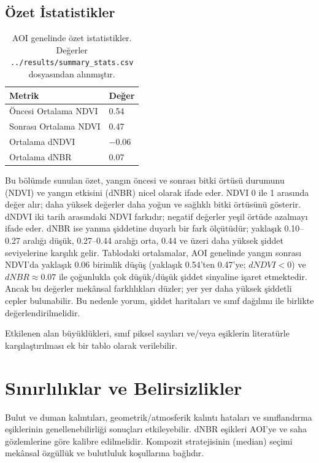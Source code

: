 \documentclass[11pt,a4paper]{article}
\begin{document}
\subsection*{Özet İstatistikler}
\begin{table}[h]
  \centering
  \begin{tabular}{@{}ll@{}}\toprule
  Metrik & Değer \\\midrule
  Öncesi Ortalama NDVI & 0.54 \\
  Sonrası Ortalama NDVI & 0.47 \\
  Ortalama dNDVI & $-0.06$ \\
  Ortalama dNBR & 0.07 \\\bottomrule
  \end{tabular}
  \caption{AOI genelinde özet istatistikler. Değerler \texttt{../results/summary\_stats.csv} dosyasından alınmıştır.}
\end{table}

Bu bölümde sunulan özet, yangın öncesi ve sonrası bitki örtüsü durumunu (NDVI) ve yangın etkisini (dNBR) nicel olarak ifade eder. NDVI 0 ile 1 arasında değer alır; daha yüksek değerler daha yoğun ve sağlıklı bitki örtüsünü gösterir. dNDVI iki tarih arasındaki NDVI farkıdır; negatif değerler yeşil örtüde azalmayı ifade eder. dNBR ise yanma şiddetine duyarlı bir fark ölçütüdür; yaklaşık 0.10--0.27 aralığı düşük, 0.27--0.44 aralığı orta, 0.44 ve üzeri daha yüksek şiddet seviyelerine karşılık gelir. Tablodaki ortalamalar, AOI genelinde yangın sonrası NDVI’da yaklaşık 0.06 birimlik düşüş (yaklaşık 0.54'ten 0.47'ye; \(dNDVI<0\)) ve \(dNBR \approx 0.07\) ile çoğunlukla çok düşük/düşük şiddet sinyaline işaret etmektedir. Ancak bu değerler mekânsal farklılıkları düzler; yer yer daha yüksek şiddetli cepler bulunabilir. Bu nedenle yorum, şiddet haritaları ve sınıf dağılımı ile birlikte değerlendirilmelidir.

Etkilenen alan büyüklükleri, sınıf piksel sayıları ve/veya eşiklerin literatürle
karşılaştırılması ek bir tablo olarak verilebilir.

\section{Sınırlılıklar ve Belirsizlikler}
Bulut ve duman kalıntıları, geometrik/atmosferik kalıntı hataları ve sınıflandırma
eşiklerinin genellenebilirliği sonuçları etkileyebilir. dNBR eşikleri AOI'ye ve saha
gözlemlerine göre kalibre edilmelidir. Kompozit stratejisinin (median) seçimi mekânsal
özgüllük ve bulutluluk koşullarına bağlıdır.
\end{document}
